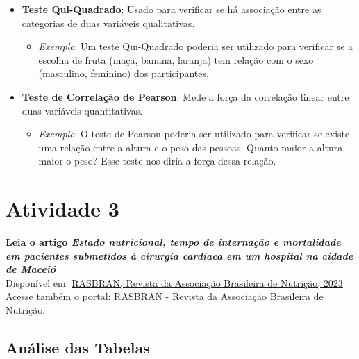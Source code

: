 \documentclass[
]{book}
\providecommand{\tightlist}{%
  \setlength{\itemsep}{0pt}\setlength{\parskip}{0pt}}
\begin{document}
\begin{itemize}
\tightlist
\item
  \textbf{Teste Qui-Quadrado}: Usado para verificar se há associação entre as categorias de duas variáveis qualitativas.

  \begin{itemize}
  \tightlist
  \item
    \emph{Exemplo}: Um teste Qui-Quadrado poderia ser utilizado para verificar se a escolha de fruta (maçã, banana, laranja) tem relação com o sexo (masculino, feminino) dos participantes.
  \end{itemize}
\item
  \textbf{Teste de Correlação de Pearson}: Mede a força da correlação linear entre duas variáveis quantitativas.

  \begin{itemize}
  \tightlist
  \item
    \emph{Exemplo}: O teste de Pearson poderia ser utilizado para verificar se existe uma relação entre a altura e o peso das pessoas. Quanto maior a altura, maior o peso? Esse teste nos diria a força dessa relação.
  \end{itemize}
\end{itemize}

\section{Atividade 3}\label{atividade-3}

\textbf{Leia o artigo \emph{Estado nutricional, tempo de internação e mortalidade em pacientes submetidos à cirurgia cardíaca em um hospital na cidade de Maceió}}\\
Disponível em: \href{https://www.rasbran.com.br/rasbran/article/view/1724/443}{RASBRAN, Revista da Associação Brasileira de Nutrição, 2023}\\
Acesse também o portal: \href{https://www.rasbran.com.br/}{RASBRAN - Revista da Associação Brasileira de Nutrição}.

\subsection{Análise das Tabelas}\label{anuxe1lise-das-tabelas}
\end{document}
